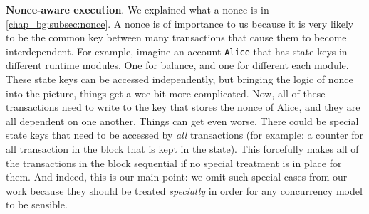 \textbf{Nonce-aware execution}. We explained what a nonce is in \ref{chap_bg:subsec:nonce}. A nonce
is of importance to us because it is very likely to be the common key between many transactions that
cause them to become interdependent. For example, imagine an account \texttt{Alice} that has state
keys in different runtime modules. One for balance, and one for different each module. These state
keys can be accessed independently, but bringing the logic of nonce into the picture, things get a
wee bit more complicated. Now, all of these transactions need to write to the key that stores the
nonce of Alice, and they are all dependent on one another. Things can get even worse. There could be
special state keys that need to be accessed by \textit{all} transactions (for example: a counter for
all transaction in the block that is kept in the state). This forcefully makes all of the
transactions in the block sequential if no special treatment is in place for them. And indeed, this
is our main point: we omit such special cases from our work because they should be treated
\textit{specially} in order for any concurrency model to be sensible.
